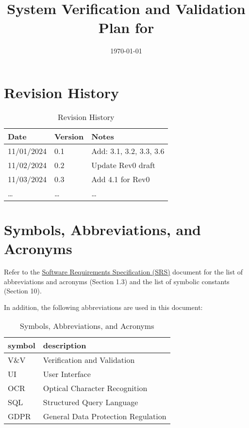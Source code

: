 \documentclass[12pt, titlepage]{article}
\begin{document}
\title{System Verification and Validation Plan for \progname{}} 
\author{\authname}
\date{\today}
	
\maketitle


\section*{Revision History}

\begin{table}[h!]
\caption{Revision History}
\begin{tabularx}{\textwidth}{p{3cm}p{2cm}X}
\toprule {\bf Date} & {\bf Version} & {\bf Notes}\\
\midrule
11/01/2024 & 0.1 & Add: 3.1, 3.2, 3.3, 3.6\\
11/02/2024 & 0.2 & Update Rev0 draft\\
11/03/2024 & 0.3 & Add 4.1 for Rev0\\
\ldots & \ldots & \ldots\\
\bottomrule
\end{tabularx}
\end{table}

\newpage

\tableofcontents

\listoftables

\newpage

\section{Symbols, Abbreviations, and Acronyms}

Refer to the
\href{https://github.com/PlutosCapstone/Plutos/blob/main/docs/SRS/SRS.pdf}{Software
Requirements Specification (SRS)} document for the list of abbreviations and
acronyms (Section 1.3) and the list of symbolic constants (Section 10).

In addition, the following abbreviations are used in this document:\\

\renewcommand{\arraystretch}{1.2}
\begin{table}[h!]
\caption{Symbols, Abbreviations, and Acronyms}
\begin{tabularx}{\textwidth}{l l}
  \toprule		
  \textbf{symbol} & \textbf{description}\\
  \midrule 
  V\&V & Verification and Validation\\
  UI & User Interface\\
  OCR & Optical Character Recognition\\
  SQL & Structured Query Language\\
  GDPR & General Data Protection Regulation\\
  \bottomrule
\end{tabularx}
\end{table}
\end{document}
